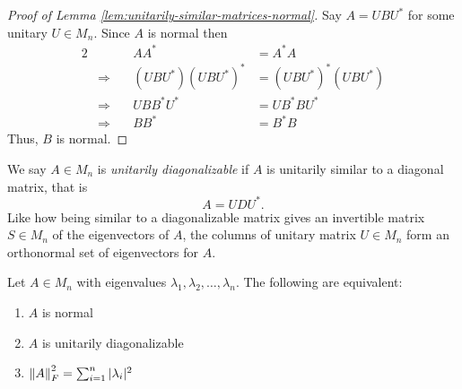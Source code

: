 \begin{proof}[Proof of Lemma \ref{lem:unitarily-similar-matrices-normal}]
Say $A = UBU^*$ for some unitary $U \in M_n$. Since $A$ is normal then
\begin{alignat*}{2}
    && AA^* &= A^*A \\
    &\Longrightarrow \quad & (UBU^*)(UBU^*)^* &= (UBU^*)^*(UBU^*) \\
    &\Longrightarrow \quad & UBB^*U^* &= UB^*BU^* \\
    &\Longrightarrow \quad & BB^* &= B^*B
\end{alignat*}
Thus, $B$ is normal.
\end{proof}

\begin{definition}
\label{def:unitarily-diagonalizable}
We say $A \in M_n$ is \textit{unitarily diagonalizable} if $A$ is unitarily similar to a diagonal matrix, that is
$$
A = UDU^*.
$$
Like how being similar to a diagonalizable matrix gives an invertible matrix $S \in M_n$ of the eigenvectors of $A$, the columns of unitary matrix $U \in M_n$ form an orthonormal set of eigenvectors for $A$.
\end{definition}

\begin{theorem}
\label{thm:spectral-thm-normal}
Let $A \in M_n$ with eigenvalues $\lambda_1, \lambda_2, \dots, \lambda_n$. The following are equivalent:
\begin{enumerate}[label=(\arabic*)]
    \item $A$ is normal
    \item $A$ is unitarily diagonalizable
    \item $\left\lVert A\right\rVert_F^2 = \sum_{i=1}^n |\lambda_i|^2$
\end{enumerate}
\end{theorem}

